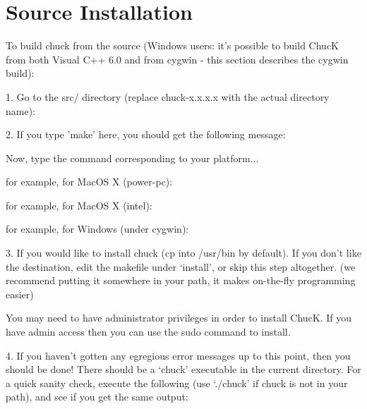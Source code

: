 \section{Source Installation}

To build chuck from the source (Windows users: it's possible to build ChucK
from both Visual C++ 6.0 and from cygwin - this section describes the cygwin
build): 

1. Go to the src/ directory (replace chuck-x.x.x.x with the actual 
directory name):



2. If you type 'make' here, you should get the following message:


Now, type the command corresponding to your platform... 

for example, for MacOS X (power-pc):


for example, for MacOS X (intel):


for example, for Windows (under cygwin):


3. If you would like to install chuck (cp into /usr/bin by default). If you 
don't like the destination, edit the makefile under `install', or 
skip this step altogether. (we recommend putting it somewhere in your 
path, it makes on-the-fly programming easier)


You may need to have administrator privileges in order to install ChucK. If you 
have admin access then you can use the sudo command to install.


4. If you haven't gotten any egregious error messages up to this point, 
then you should be done! There should be a `chuck' executable in the 
current directory. For a quick sanity check, execute the following (use 
`./chuck' if chuck is not in your path), and see if you get the same output:

